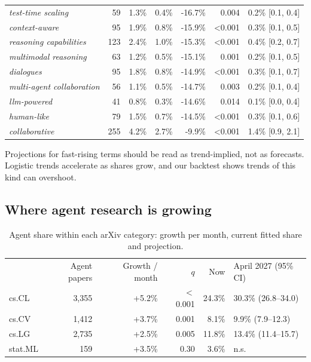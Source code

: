 \documentclass[10.5pt]{article}
\newcommand{\throw}{\rowcolor{thead}}
\newcommand{\hd}[1]{{\color{white}\sorasemi\scriptsize #1}}
\begin{document}
\begin{table}[!htbp]
\begin{tabular}{lrrrrrl}
\textit{test-time scaling} & 59 & 1.3\% & 0.4\% & -16.7\% & 0.004 & 0.2\% [0.1, 0.4] \\
\textit{context-aware} & 95 & 1.9\% & 0.8\% & -15.9\% & <0.001 & 0.3\% [0.1, 0.5] \\
\textit{reasoning capabilities} & 123 & 2.4\% & 1.0\% & -15.3\% & <0.001 & 0.4\% [0.2, 0.7] \\
\textit{multimodal reasoning} & 63 & 1.2\% & 0.5\% & -15.1\% & 0.001 & 0.2\% [0.1, 0.5] \\
\textit{dialogues} & 95 & 1.8\% & 0.8\% & -14.9\% & <0.001 & 0.3\% [0.1, 0.7] \\
\textit{multi-agent collaboration} & 56 & 1.1\% & 0.5\% & -14.7\% & 0.003 & 0.2\% [0.1, 0.4] \\
\textit{llm-powered} & 41 & 0.8\% & 0.3\% & -14.6\% & 0.014 & 0.1\% [0.0, 0.4] \\
\textit{human-like} & 79 & 1.5\% & 0.7\% & -14.5\% & <0.001 & 0.3\% [0.1, 0.6] \\
\textit{collaborative} & 255 & 4.2\% & 2.7\% & -9.9\% & <0.001 & 1.4\% [0.9, 2.1] \\
    \bottomrule
  \end{tabular}
\end{table}

Projections for fast-rising terms should be read as trend-implied, not as forecasts. Logistic trends accelerate as shares grow, and our backtest shows trends of this kind can overshoot.

\subsection{Where agent research is growing}

\begin{table}[!htbp]
  \centering\small
  \caption{Agent share within each arXiv category: growth per month, current fitted share and projection.}
  \label{tab:cats}
  \begin{tabular}{lrrrrl}
    \throw \hd{Category} & \hd{Agent papers} & \hd{Growth / month} & \hd{$q$} & \hd{Now} & \hd{April 2027 (95\% CI)} \\
    cs.CL & 3,355 & +5.2\% & $<$0.001 & 24.3\% & 30.3\% (26.8--34.0) \\
    \rowcolor{lav} cs.CV & 1,412 & +3.7\% & 0.001 & 8.1\% & 9.9\% (7.9--12.3) \\
    cs.LG & 2,735 & +2.5\% & 0.005 & 11.8\% & 13.4\% (11.4--15.7) \\
    \rowcolor{lav} stat.ML & 159 & +3.5\% & 0.30 & 3.6\% & n.s. \\
    \bottomrule
  \end{tabular}
\end{table}
\end{document}
